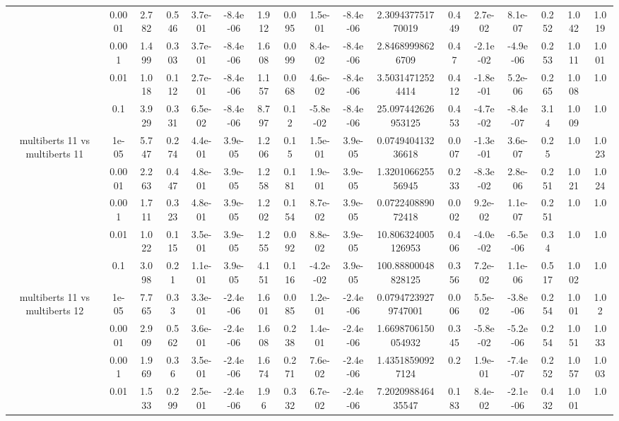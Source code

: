 \begin{tabular}{|c|c|c|c|c|c|c|c|c|c|c|c|c|c|c|c|c|}
 & 0.0001 & 2.782 & 0.546 & 3.7e-01 & -8.4e-06 & 1.912 & 0.095 & 1.5e-01 & -8.4e-06 & 2.309437751770019 & 0.449 & 2.7e-02 & 8.1e-07 & 0.252 & 1.042 & 1.019 \\
 & 0.001 & 1.499 & 0.303 & 3.7e-01 & -8.4e-06 & 1.608 & 0.099 & 8.4e-02 & -8.4e-06 & 2.84689998626709 & 0.47 & -2.1e-02 & -4.9e-06 & 0.253 & 1.011 & 1.001 \\
 & 0.01 & 1.018 & 0.112 & 2.7e-01 & -8.4e-06 & 1.157 & 0.068 & 4.6e-02 & -8.4e-06 & 3.50314712524414 & 0.412 & -1.8e-01 & 5.2e-06 & 0.265 & 1.008 & 1.0 \\
 & 0.1 & 3.929 & 0.331 & 6.5e-02 & -8.4e-06 & 8.797 & 0.12 & -5.8e-02 & -8.4e-06 & 25.097442626953125 & 0.453 & -4.7e-02 & -8.4e-07 & 3.14 & 1.009 & 1.0 \\
\hline
\multirow{5}{*}{multiberts 11 vs multiberts 11} & 1e-05 & 5.747 & 0.274 & 4.4e-01 & 3.9e-05 & 1.206 & 0.15 & 1.5e-01 & 3.9e-05 & 0.074940413236618 & 0.007 & -1.3e-01 & 3.6e-07 & 0.25 & 1.0 & 1.023 \\
 & 0.0001 & 2.263 & 0.447 & 4.8e-01 & 3.9e-05 & 1.258 & 0.181 & 1.9e-01 & 3.9e-05 & 1.320106625556945 & 0.233 & -8.3e-02 & 2.8e-06 & 0.251 & 1.021 & 1.024 \\
 & 0.001 & 1.711 & 0.323 & 4.8e-01 & 3.9e-05 & 1.202 & 0.154 & 8.7e-02 & 3.9e-05 & 0.072240889072418 & 0.002 & 9.2e-02 & 1.1e-07 & 0.251 & 1.0 & 1.0 \\
 & 0.01 & 1.022 & 0.115 & 3.5e-01 & 3.9e-05 & 1.255 & 0.092 & 8.8e-02 & 3.9e-05 & 10.806324005126953 & 0.406 & -4.0e-02 & -6.5e-06 & 0.34 & 1.0 & 1.0 \\
 & 0.1 & 3.098 & 0.21 & 1.1e-01 & 3.9e-05 & 4.151 & 0.116 & -4.2e-02 & 3.9e-05 & 100.88800048828125 & 0.356 & 7.2e-02 & 1.1e-06 & 0.517 & 1.002 & 1.0 \\
\hline
\multirow{5}{*}{multiberts 11 vs multiberts 12} & 1e-05 & 7.765 & 0.33 & 3.3e-01 & -2.4e-06 & 1.601 & 0.085 & 1.2e-01 & -2.4e-06 & 0.07947239279747001 & 0.006 & 5.5e-02 & -3.8e-06 & 0.254 & 1.001 & 1.02 \\
 & 0.0001 & 2.909 & 0.562 & 3.6e-01 & -2.4e-06 & 1.608 & 0.238 & 1.4e-01 & -2.4e-06 & 1.6698706150054932 & 0.345 & -5.8e-02 & -5.2e-06 & 0.254 & 1.051 & 1.033 \\
 & 0.001 & 1.969 & 0.36 & 3.5e-01 & -2.4e-06 & 1.674 & 0.271 & 7.6e-02 & -2.4e-06 & 1.43518590927124 & 0.2 & 1.9e-01 & -7.4e-07 & 0.252 & 1.057 & 1.003 \\
 & 0.01 & 1.533 & 0.299 & 2.5e-01 & -2.4e-06 & 1.96 & 0.332 & 6.7e-02 & -2.4e-06 & 7.202098846435547 & 0.183 & 8.4e-02 & -2.1e-06 & 0.432 & 1.001 & 1.0 \\

\end{tabular}

